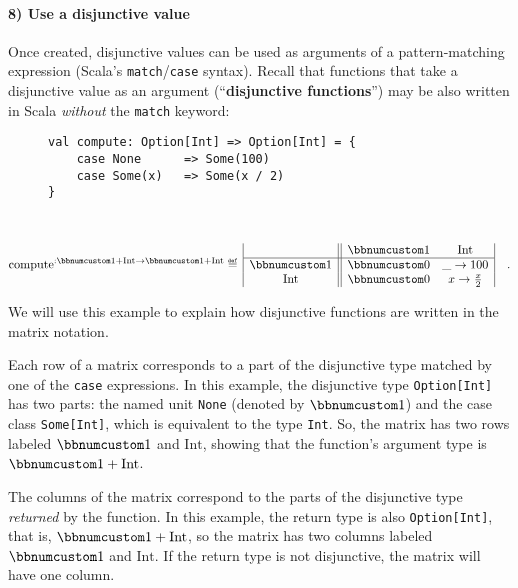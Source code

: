 \paragraph{8) Use a disjunctive value}

Once created, disjunctive values can be used as arguments of a pattern-matching
expression (Scala\textsf{'}s \lstinline!match!/\lstinline!case! syntax).
Recall that functions that take a disjunctive value as an argument
(\textsf{``}\textbf{disjunctive functions}\textsf{''})
may be also written in Scala \emph{without} the \lstinline!match!
keyword:

\begin{wrapfigure}{l}{0.5\columnwidth}%
\vspace{-0.65\baselineskip}
\begin{lstlisting}
val compute: Option[Int] => Option[Int] = {
    case None      => Some(100)
    case Some(x)   => Some(x / 2)
}
\end{lstlisting}

\vspace{-1.65\baselineskip}
\end{wrapfigure}%

~\vspace{-1.45\baselineskip}
\[
\text{compute}^{:\bbnum 1+\text{Int}\rightarrow\bbnum 1+\text{Int}}\triangleq\,\begin{array}{|c||cc|}
 & \bbnum 1 & \text{Int}\\
\hline \bbnum 1 & \bbnum 0 & \_\rightarrow100\\
\text{Int} & \bbnum 0 & x\rightarrow\frac{x}{2}
\end{array}\quad.
\]
\vspace{-0.9\baselineskip}

We will use this example to explain how disjunctive functions are
written in the matrix notation.

Each row of a matrix corresponds to a part of the disjunctive type
matched by one of the \lstinline!case! expressions. In this example,
the disjunctive type \lstinline!Option[Int]! has two parts: the named
unit \lstinline!None! (denoted by $\bbnum 1$) and the case class
\lstinline!Some[Int]!, which is equivalent to the type \lstinline!Int!.
So, the matrix has two rows labeled $\bbnum 1$ and $\text{Int}$,
showing that the function\textsf{'}s argument type is $\bbnum 1+\text{Int}$.

The columns of the matrix correspond to the parts of the disjunctive
type \emph{returned} by the function. In this example, the return
type is also \lstinline!Option[Int]!, that is, $\bbnum 1+\text{Int}$,
so the matrix has two columns labeled $\bbnum 1$ and $\text{Int}$.
If the return type is not disjunctive, the matrix will have one column.

